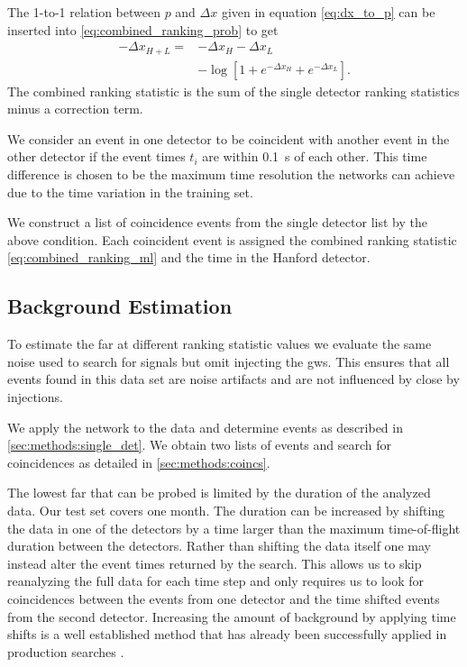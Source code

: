 The 1-to-1 relation between $p$ and $\Delta x$ given in equation \eqref{eq:dx_to_p} can be inserted into \eqref{eq:combined_ranking_prob} to get
\begin{align}\label{eq:combined_ranking_ml}
-\Delta x_{H+L} = &-\Delta x_H - \Delta x_L \nonumber\\
                  & - \log\left[1 + e^{-\Delta x_H} + e^{-\Delta x_L}\right].
\end{align}
The combined ranking statistic is the sum of the single detector ranking statistics minus a correction term.

We consider an event in one detector to be coincident with another event in the other detector if the event times $t_i$ are within \SI{0.1}{\second} of each other. This time difference is chosen to be the maximum time resolution the networks can achieve due to the time variation in the training set.

We construct a list of coincidence events from the single detector list by the above condition. Each coincident event is assigned the combined ranking statistic \eqref{eq:combined_ranking_ml} and the time in the Hanford detector.

\subsection{Background Estimation}\label{sec:methods:background}
To estimate the \acrshort{far} at different ranking statistic values we evaluate the same noise used to search for signals but omit injecting the \acrshort{gw}s. This ensures that all events found in this data set are noise artifacts and are not influenced by close by injections.

We apply the network to the data and determine events as described in \autoref{sec:methods:single_det}. We obtain two lists of events and search for coincidences as detailed in \autoref{sec:methods:coincs}.

The lowest \acrshort{far} that can be probed is limited by the duration of the analyzed data. Our test set covers one month. The duration can be increased by shifting the data in one of the detectors by a time larger than the maximum time-of-flight duration between the detectors. Rather than shifting the data itself one may instead alter the event times returned by the search. This allows us to skip reanalyzing the full data for each time step and only requires us to look for coincidences between the events from one detector and the time shifted events from the second detector. Increasing the amount of background by applying time shifts is a well established method that has already been successfully applied in production searches \cite{LIGOScientific:2020ibl, Usman:2015kfa, Sachdev:2019vvd}.

